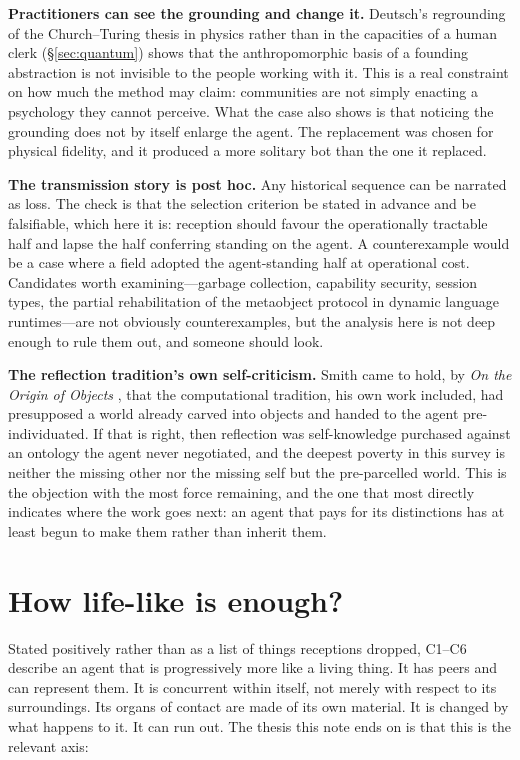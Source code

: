 \documentclass[11pt,a4paper]{article}
\begin{document}
\textbf{Practitioners can see the grounding and change it.} Deutsch's regrounding
of the Church--Turing thesis in physics rather than in the capacities of a human
clerk (\S\ref{sec:quantum}) shows that the anthropomorphic basis of a founding
abstraction is not invisible to the people working with it. This is a real
constraint on how much the method may claim: communities are not simply enacting
a psychology they cannot perceive. What the case also shows is that noticing the
grounding does not by itself enlarge the agent. The replacement was chosen for
physical fidelity, and it produced a more solitary bot than the one it replaced.

\textbf{The transmission story is post hoc.} Any historical sequence can be
narrated as loss. The check is that the selection criterion be stated in advance
and be falsifiable, which here it is: reception should favour the operationally
tractable half and lapse the half conferring standing on the agent. A
counterexample would be a case where a field adopted the agent-standing half at
operational cost. Candidates worth examining---garbage collection, capability
security, session types, the partial rehabilitation of the metaobject protocol in
dynamic language runtimes---are not obviously counterexamples, but the analysis
here is not deep enough to rule them out, and someone should look.

\textbf{The reflection tradition's own self-criticism.} Smith came to hold, by
\emph{On the Origin of Objects} \cite{smith1996}, that the computational tradition,
his own work included, had presupposed a world already carved into objects and
handed to the agent pre-individuated. If that is right, then reflection was
self-knowledge purchased against an ontology the agent never negotiated, and the
deepest poverty in this survey is neither the missing other nor the missing self
but the pre-parcelled world. This is the objection with the most force remaining,
and the one that most directly indicates where the work goes next: an agent that
pays for its distinctions has at least begun to make them rather than inherit them.

\section{How life-like is enough?}
\label{sec:threshold}

Stated positively rather than as a list of things receptions dropped, C1--C6
describe an agent that is progressively more like a living thing. It has peers
and can represent them. It is concurrent within itself, not merely with respect
to its surroundings. Its organs of contact are made of its own material. It is
changed by what happens to it. It can run out. The thesis this note ends on is
that this is the relevant axis:
\end{document}
